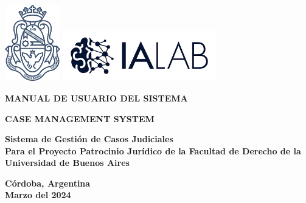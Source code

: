 \begin{center}

\includegraphics[width=0.18\textwidth]{fig/logoUNC.png}
\includegraphics[width=0.5\textwidth]{fig/ialab.png}

\vspace*{1cm}
\begin{large}
\textbf{MANUAL DE USUARIO DEL SISTEMA}
\end{large}


\vspace*{0.1in}
\AddToShipoutPictureBG*{\AtPageLowerLeft{%
  \color{US_red!20}\rule{.25\paperwidth}{\paperheight}}}


\textbf{\huge CASE MANAGEMENT SYSTEM}

\vspace*{.5in}

{\Large \textbf{Sistema de Gestión de Casos Judiciales}}\\
{\Large \textbf{Para el Proyecto Patrocinio Jurídico de la Facultad de Derecho de la Universidad de Buenos Aires}}
        

\vspace*{4in}

\textbf{Córdoba, Argentina}\\
\textbf{Marzo del 2024}
\vspace*{0.2in}
\end{center}


\thispagestyle{empty} %
\clearpage\setcounter{page}{1} %
